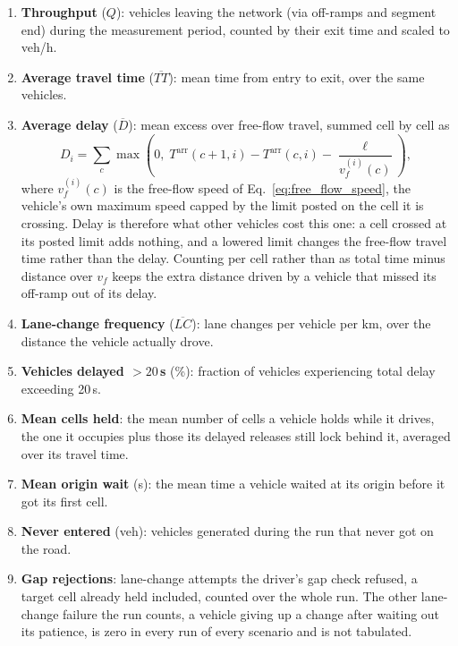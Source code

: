 \documentclass[review,number]{elsarticle}
\newcommand{\Tarr}{T^{\text{arr}}}
\begin{document}
\begin{enumerate}
    \item \textbf{Throughput} ($Q$): vehicles leaving the network (via off-ramps and segment end) during the measurement period, counted by their exit time and scaled to veh/h.
    \item \textbf{Average travel time} ($\overline{TT}$): mean time from entry to exit, over the same vehicles.
    \item \textbf{Average delay} ($\overline{D}$): mean excess over free-flow travel, summed cell by cell as
    \begin{equation}
        D_i = \sum_{c} \max\!\left(0,\; \Tarr(c+1,i) - \Tarr(c,i) - \frac{\ell}{v_f^{(i)}(c)}\right),
        \label{eq:delay}
    \end{equation}
    where $v_f^{(i)}(c)$ is the free-flow speed of Eq.~\ref{eq:free_flow_speed}, the vehicle's own maximum speed capped by the limit posted on the cell it is crossing. Delay is therefore what other vehicles cost this one: a cell crossed at its posted limit adds nothing, and a lowered limit changes the free-flow travel time rather than the delay. Counting per cell rather than as total time minus distance over $v_f$ keeps the extra distance driven by a vehicle that missed its off-ramp out of its delay.
    \item \textbf{Lane-change frequency} ($\overline{LC}$): lane changes per vehicle per km, over the distance the vehicle actually drove.
    \item \textbf{Vehicles delayed $> 20$\,s} (\%): fraction of vehicles experiencing total delay exceeding 20\,s.
    \item \textbf{Mean cells held}: the mean number of cells a vehicle holds while it drives, the one it occupies plus those its delayed releases still lock behind it, averaged over its travel time.
    \item \textbf{Mean origin wait} (s): the mean time a vehicle waited at its origin before it got its first cell.
    \item \textbf{Never entered} (veh): vehicles generated during the run that never got on the road.
    \item \textbf{Gap rejections}: lane-change attempts the driver's gap check refused, a target cell already held included, counted over the whole run. The other lane-change failure the run counts, a vehicle giving up a change after waiting out its patience, is zero in every run of every scenario and is not tabulated.
\end{enumerate}
\end{document}
